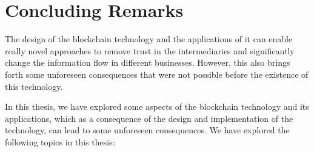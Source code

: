 \chapter{Concluding Remarks} \label{sec:conclusion}


The design of the blockchain technology and the applications of it can enable really novel approaches to remove trust in the intermediaries and significantly change the information flow in different businesses. However, this also brings forth some unforeseen consequences that were not possible before the existence of this technology.

In this thesis, we have explored some aspects of the blockchain technology and its applications, which as a consequence of the design and implementation of the technology, can lead to some unforeseen consequences. We have explored the following topics in this thesis:  



